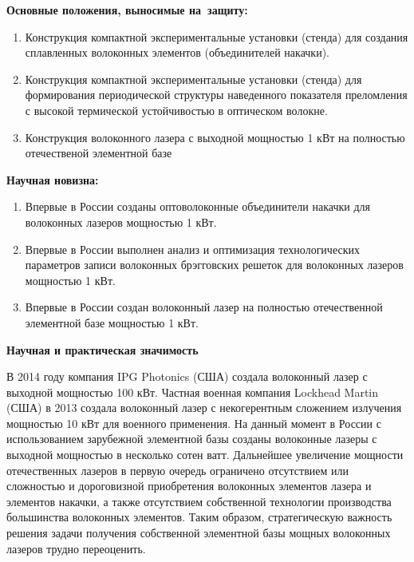 \textbf{Основные положения, выносимые на~защиту:}
\begin{enumerate}
  \item Конструкция компактной экспериментальные установки (стенда) для создания сплавленных волоконных элементов (объединителей накачки).
  \item Конструкция компактной экспериментальные установки (стенда) для формирования периодической структуры наведенного показателя преломления с высокой термической устойчивостью в оптическом волокне.
  \item Конструкция волоконного лазера с выходной мощностью 1 кВт на полностью отечественой элементной базе
\end{enumerate}

\textbf{Научная новизна:}
\begin{enumerate}
  \item Впервые в России созданы оптоволоконные объединители накачки для волоконных лазеров мощностью 1 кВт.
  \item Впервые в России выполнен анализ и оптимизация технологических параметров записи волоконных брэгговских решеток для волоконных лазеров мощностью 1 кВт.
  \item Впервые в России создан волоконный лазер на полностью отечественной элементной базе мощностью 1 кВт.
\end{enumerate}

\textbf{Научная и практическая значимость}

В 2014 году компания IPG Photonics (США) создала волоконный лазер с выходной мощностью 100 кВт. Частная военная компания Lockhead Martin (США) в 2013 создала волоконный лазер с некогерентным сложением излучения мощностью 10 кВт для военного применения. На данный момент в России с использованием зарубежной элементной базы созданы волоконные лазеры с выходной мощностью в несколько сотен ватт. Дальнейшее увеличение мощности отечественных лазеров в первую очередь ограничено отсутствием или сложностью и дороговизной приобретения волоконных элементов лазера и элементов накачки, а также отсутствием собственной технологии производства большинства волоконных элементов. Таким образом, стратегическую важность решения задачи получения собственной элементной базы мощных волоконных лазеров трудно переоценить.

